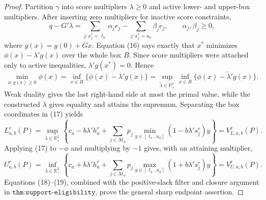 \documentclass{article}
\begin{document}
\begin{proof}
Partition \(\gamma\) into score multipliers \(\lambda\ge0\) and active lower- and upper-box multipliers.  After inserting zero multipliers for inactive score constraints,
\[
 q-G'\lambda
 =\sum_{j:x_j^*=\ell_a}\alpha_je_j
  -\sum_{j:x_j^*=u_a}\beta_je_j,
 \qquad \alpha_j,\beta_j\ge0,                                                 \tag{16}
\]
where \(g(x)=g(0)+Gx\).  Equation (16) says exactly that \(x^*\) minimizes \(\phi(x)-\lambda'g(x)\) over the whole box \(B\).  Since score multipliers were attached only to active inequalities, \(\lambda'g(x^*)=0\).  Hence
\[
 \min_{x:g(x)\ge0}\phi(x)
 =\inf_{x\in B}\{\phi(x)-\lambda'g(x)\}
 =\sup_{\widetilde\lambda\in\mathbb R_+^2}
   \inf_{x\in B}\{\phi(x)-\widetilde\lambda'g(x)\}.                       \tag{17}
\]
Weak duality gives the last right-hand side at most the primal value, while the constructed \(\lambda\) gives equality and attains the supremum.  Separating the box coordinates in (17) yields
\[
 L_{a,b}^r(P)
 =\sup_{\lambda\in\mathbb R_+^2}
 \left\{c_a-b\lambda'h_a^r+
 \sum_{j\in\mathcal M_a}p_j
 \min_{y\in[\ell_a,u_a]}(1-b\lambda's_j^r)y\right\}
 =V_{L,a,b}^r(P).                                                             \tag{18}
\]
Applying (17) to \(-\phi\) and multiplying by \(-1\) gives, with an attaining multiplier,
\[
 U_{a,b}^r(P)
 =\inf_{\lambda\in\mathbb R_+^2}
 \left\{c_a+b\lambda'h_a^r+
 \sum_{j\in\mathcal M_a}p_j
 \max_{y\in[\ell_a,u_a]}(1+b\lambda's_j^r)y\right\}
 =V_{U,a,b}^r(P).                                                             \tag{19}
\]
Equations (18)--(19), combined with the positive-slack filter and closure argument in \(\texttt{thm:support-eligibility}\), prove the general sharp endpoint assertion.


\end{proof}
\end{document}
